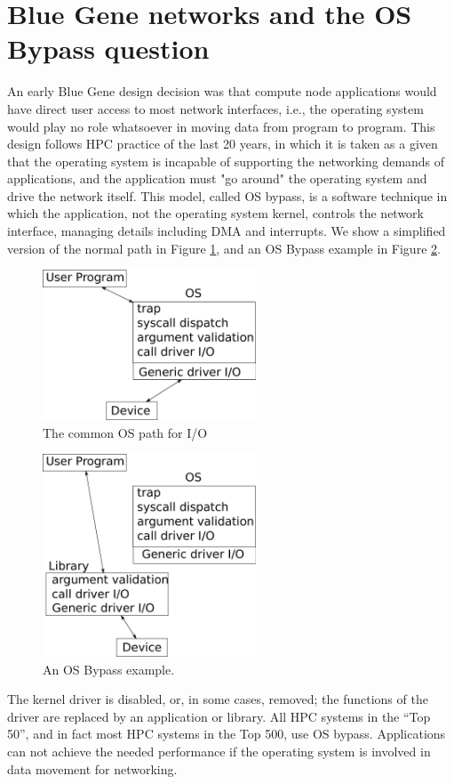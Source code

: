 \documentclass[letterpaper,twocolumn,10pt]{article}
\begin{document}
\section{Blue Gene networks and the OS Bypass question}
An early Blue Gene design decision was that  compute node applications would have direct user access to most network interfaces, i.e., the operating system would play no role whatsoever in moving data from program to program. This 
design follows HPC practice of the last 20 years, in which it is taken as a given that the operating system 
is incapable of supporting the networking demands of applications, and the application must "go around" the operating system and drive the network itself. This model, called OS bypass, is a software technique in which the application, not the operating system 
kernel, controls the network interface, managing details including DMA and interrupts. 
We show a simplified version of the normal path in Figure \ref{ospath}, and an OS Bypass example in Figure \ref{osbypass}.
\begin{figure}
\includegraphics[width=2.5in]{ospath}
\caption{\label{ospath}The common OS path for I/O}
\end{figure}
\begin{figure}
\includegraphics[width=2.5in]{osbypass}
\caption{\label{osbypass}An OS Bypass example.}
\end{figure}
The kernel driver is disabled, or, in some cases, removed; the functions of the driver are replaced by 
an application or library. 
All HPC systems in the ``Top 50'', and in fact most HPC systems in the Top 500, use OS bypass. Applications can not 
achieve the needed performance if the operating system is involved in data movement for networking. 
\end{document}
